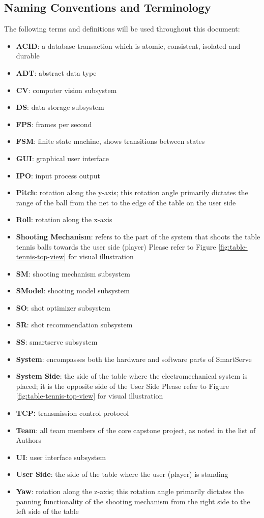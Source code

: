 \documentclass[11pt]{article}
\begin{document}
\subsection{Naming Conventions and Terminology}
\label{sec:definitions}
The following terms and definitions will be used throughout this document:
\begin{itemize}
\item \textbf{ACID}: a database transaction which is atomic, consistent, isolated and durable
\item \textbf{ADT}: abstract data type
\item \textbf{CV}: computer vision subsystem
\item \textbf{DS}: data storage subsystem
\item \textbf{FPS}: frames per second
\item \textbf{FSM}: finite state machine, shows transitions between states
\item \textbf{GUI}: graphical user interface
\item \textbf{IPO}: input process output
\item \textbf{Pitch}: rotation along the y-axis; this rotation angle primarily dictates the range of the ball from the net to the edge of the table on the user side
\item \textbf{Roll}: rotation along the x-axis
\item \textbf{Shooting Mechanism}: refers to the part of the system that shoots the table tennis balls towards the user side (player) Please refer to Figure \ref{fig:table-tennis-top-view} for visual illustration\
\item \textbf{SM}: shooting mechanism subsystem
\item \textbf{SModel}: shooting model subsystem
\item \textbf{SO}: shot optimizer subsystem
\item \textbf{SR}: shot recommendation subsystem
\item \textbf{SS}: smartserve subsystem
\item \textbf{System}: encompasses both the hardware and software parts of SmartServe
\item \textbf{System Side}: the side of the table where the electromechanical system is placed; it is the opposite side of the User Side Please refer to Figure \ref{fig:table-tennis-top-view} for visual illustration
\item \textbf{TCP:} transmission control protocol
\item \textbf{Team}: all team members of the core capstone project, as noted in the list of Authors
\item \textbf{UI}: user interface subsystem
\item \textbf{User Side}: the side of the table where the user (player) is standing
\item \textbf{Yaw}: rotation along the z-axis; this rotation angle primarily dictates the panning functionality of the shooting mechanism from the right side to the left side of the table
\end{itemize}
\end{document}
